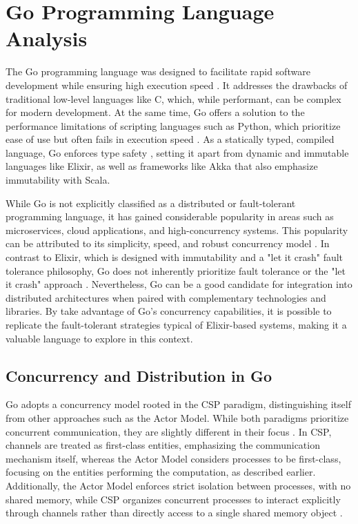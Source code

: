 \section{Go Programming Language Analysis}

The Go programming language was designed to facilitate rapid software development while ensuring high execution speed \cite{Kennedy2016, Cox-Buday2017}. It addresses the drawbacks of traditional low-level languages like C, which, while performant, can be complex for modern development. At the same time, Go offers a solution to the performance limitations of scripting languages such as Python, which prioritize ease of use but often fails in execution speed \cite{Kennedy2016}. As a statically typed, compiled language, Go enforces type safety \cite{go-docs}, setting it apart from dynamic and immutable languages like Elixir, as well as frameworks like Akka that also emphasize immutability with Scala.

While Go is not explicitly classified as a distributed or fault-tolerant programming language, it has gained considerable popularity in areas such as microservices, cloud applications, and high-concurrency systems. This popularity can be attributed to its simplicity, speed, and robust concurrency model \cite{Castro2019,Shuiskov2022}. In contrast to Elixir, which is designed with immutability and a "let it crash" fault tolerance philosophy, Go does not inherently prioritize fault tolerance or the "let it crash" approach \cite{Cox-Buday2017}. Nevertheless, Go can be a good candidate for integration into distributed architectures when paired with complementary technologies and libraries. By take advantage of Go’s concurrency capabilities, it is possible to replicate the fault-tolerant strategies typical of Elixir-based systems, making it a valuable language to explore in this context.

\subsection{Concurrency and Distribution in Go}

Go adopts a concurrency model rooted in the \gls{CSP} paradigm, distinguishing itself from other approaches such as the Actor Model. While both paradigms prioritize concurrent communication, they are slightly different in their focus \cite{Cox-Buday2017}. In \gls{CSP}, channels are treated as first-class entities, emphasizing the communication mechanism itself, whereas the Actor Model considers processes to be first-class, focusing on the entities performing the computation, as described earlier. Additionally, the Actor Model enforces strict isolation between processes, with no shared memory, while CSP organizes concurrent processes to interact explicitly through channels rather than directly access to a single shared memory object \cite{Cox-Buday2017}.


